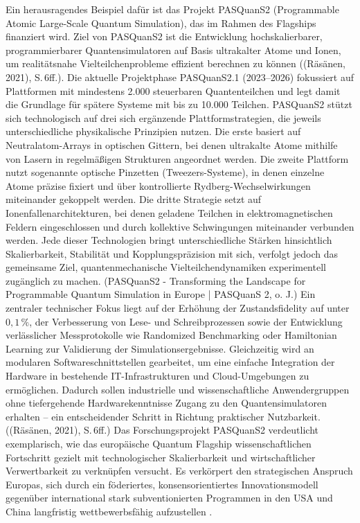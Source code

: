 Ein herausragendes Beispiel dafür ist das Projekt PASQuanS2 (Programmable Atomic Large-Scale Quantum Simulation), das im Rahmen des Flagships finanziert wird. Ziel von PASQuanS2 ist die Entwicklung hochskalierbarer, programmierbarer Quantensimulatoren auf Basis ultrakalter Atome und Ionen, um realitätsnahe Vielteilchenprobleme effizient berechnen zu können \cite{}((Räsänen, 2021), S. 6ff.). Die aktuelle Projektphase PASQuanS2.1 (2023–2026) fokussiert auf Plattformen mit mindestens 2.000 steuerbaren Quantenteilchen und legt damit die Grundlage für spätere Systeme mit bis zu 10.000 Teilchen. 
PASQuanS2 stützt sich technologisch auf drei sich ergänzende Plattformstrategien, die jeweils unterschiedliche physikalische Prinzipien nutzen. Die erste basiert auf Neutralatom-Arrays in optischen Gittern, bei denen ultrakalte Atome mithilfe von Lasern in regelmäßigen Strukturen angeordnet werden. Die zweite Plattform nutzt sogenannte optische Pinzetten (Tweezers-Systeme), in denen einzelne Atome präzise fixiert und über kontrollierte Rydberg-Wechselwirkungen miteinander gekoppelt werden. Die dritte Strategie setzt auf Ionenfallenarchitekturen, bei denen geladene Teilchen in elektromagnetischen Feldern eingeschlossen und durch kollektive Schwingungen miteinander verbunden werden. Jede dieser Technologien bringt unterschiedliche Stärken hinsichtlich Skalierbarkeit, Stabilität und Kopplungspräzision mit sich, verfolgt jedoch das gemeinsame Ziel, quantenmechanische Vielteilchendynamiken experimentell zugänglich zu machen. \cite{}(PASQuanS2 - Transforming the Landscape for Programmable Quantum Simulation in Europe | PASQuanS 2, o. J.) Ein zentraler technischer Fokus liegt auf der Erhöhung der Zustandsfidelity auf unter \(0{,}1\,\%\), der Verbesserung von Lese- und Schreibprozessen sowie der Entwicklung verlässlicher Messprotokolle wie Randomized Benchmarking oder Hamiltonian Learning zur Validierung der Simulationsergebnisse. Gleichzeitig wird an modularen Softwareschnittstellen gearbeitet, um eine einfache Integration der Hardware in bestehende IT-Infrastrukturen und Cloud-Umgebungen zu ermöglichen. Dadurch sollen industrielle und wissenschaftliche Anwendergruppen ohne tiefergehende Hardwarekenntnisse Zugang zu den Quantensimulatoren erhalten – ein entscheidender Schritt in Richtung praktischer Nutzbarkeit. \cite{}((Räsänen, 2021), S. 6ff.)
Das Forschungsprojekt PASQuanS2 verdeutlicht exemplarisch, wie das europäische Quantum Flagship wissenschaftlichen Fortschritt gezielt mit technologischer Skalierbarkeit und wirtschaftlicher Verwertbarkeit zu verknüpfen versucht. Es verkörpert den strategischen Anspruch Europas, sich durch ein föderiertes, konsensorientiertes Innovationsmodell gegenüber international stark subventionierten Programmen in den USA und China langfristig wettbewerbsfähig aufzustellen \citealp[7ff.]{vogiatzoglouEUsQuestDigital2025}.
 

